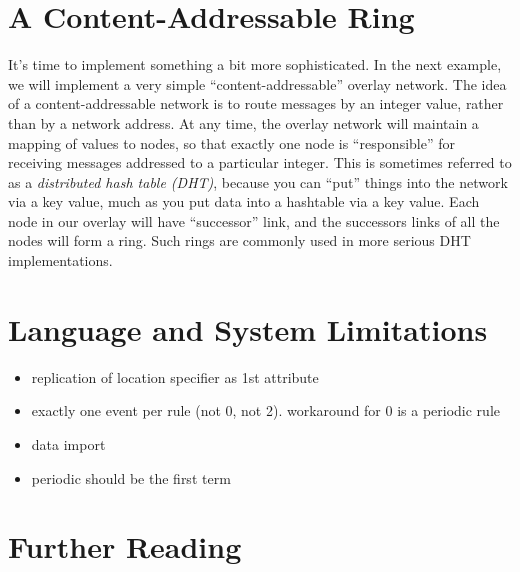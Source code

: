 \documentclass{article}
\begin{document}
\section{A Content-Addressable Ring}
It's time to implement something a bit more sophisticated.  In the
next example, we will implement a very simple ``content-addressable''
overlay network.  The idea of a content-addressable network is to
route messages by an integer value, rather than by a network address.
At any time, the overlay network will maintain a mapping of values to
nodes, so that exactly one node is ``responsible'' for receiving
messages addressed to a particular integer.  This is sometimes
referred to as a {\em distributed hash table (DHT)}, because you can
``put'' things into the network via a key value, much as you put data
into a hashtable via a key value.  Each node in our overlay will have
``successor'' link, and the successors links of all the nodes will
form a ring.  Such rings are commonly used in more serious DHT
implementations.




\section{Language and System Limitations}
\begin{itemize}
\item replication of location specifier as 1st attribute
\item exactly one event per rule (not 0, not 2).  workaround for 0 is
      a periodic rule
\item data import
\item periodic should be the first term
\end{itemize}
\section{Further Reading}
\end{document}
